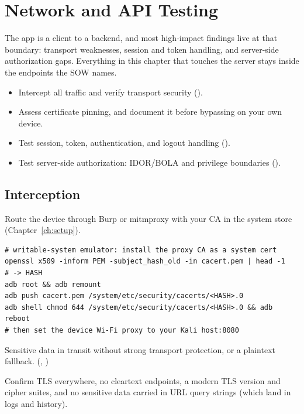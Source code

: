 \chapter{Network and API Testing}\label{ch:network}

The app is a client to a backend, and most high-impact findings live at that boundary: transport weaknesses, session and token handling, and server-side authorization gaps. Everything in this chapter that touches the server stays inside the endpoints the SOW names.

\begin{objectives}
\begin{itemize}[leftmargin=12pt]
\item Intercept all traffic and verify transport security ().
\item Assess certificate pinning, and document it before bypassing on your own device.
\item Test session, token, authentication, and logout handling ().
\item Test server-side authorization: IDOR/BOLA and privilege boundaries ().
\end{itemize}
\end{objectives}

\section{Interception}
Route the device through Burp or mitmproxy with your CA in the system store (Chapter~\ref{ch:setup}).

\begin{lstlisting}
# writable-system emulator: install the proxy CA as a system cert
openssl x509 -inform PEM -subject_hash_old -in cacert.pem | head -1   # -> HASH
adb root && adb remount
adb push cacert.pem /system/etc/security/cacerts/<HASH>.0
adb shell chmod 644 /system/etc/security/cacerts/<HASH>.0 && adb reboot
# then set the device Wi-Fi proxy to your Kali host:8080
\end{lstlisting}

\begin{findingbox}
Sensitive data in transit without strong transport protection, or a plaintext fallback. (, )
\end{findingbox}
Confirm TLS everywhere, no cleartext endpoints, a modern TLS version and cipher suites, and no sensitive data carried in URL query strings (which land in logs and history).

